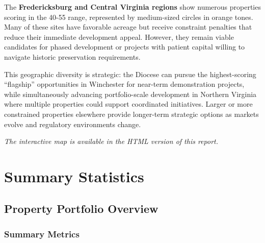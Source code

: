 \documentclass[
  letterpaper,
  DIV=11,
  numbers=noendperiod,
  oneside]{scrreprt}
\begin{document}
The \textbf{Fredericksburg and Central Virginia regions} show numerous
properties scoring in the 40-55 range, represented by medium-sized
circles in orange tones. Many of these sites have favorable acreage but
receive constraint penalties that reduce their immediate development
appeal. However, they remain viable candidates for phased development or
projects with patient capital willing to navigate historic preservation
requirements.

\begin{tcolorbox}[enhanced jigsaw, bottomtitle=1mm, left=2mm, rightrule=.15mm, colbacktitle=quarto-callout-tip-color!10!white, arc=.35mm, title=\textcolor{quarto-callout-tip-color}{\faLightbulb}\hspace{0.5em}{Tip}, bottomrule=.15mm, colback=white, colframe=quarto-callout-tip-color-frame, leftrule=.75mm, titlerule=0mm, opacitybacktitle=0.6, breakable, coltitle=black, toptitle=1mm, toprule=.15mm, opacityback=0]

This geographic diversity is strategic: the Diocese can pursue the
highest-scoring ``flagship'' opportunities in Winchester for near-term
demonstration projects, while simultaneously advancing portfolio-scale
development in Northern Virginia where multiple properties could support
coordinated initiatives. Larger or more constrained properties elsewhere
provide longer-term strategic options as markets evolve and regulatory
environments change.

\end{tcolorbox}

\emph{The interactive map is available in the HTML version of this
report.}

\part{Summary Statistics}

\chapter{Property Portfolio Overview}\label{property-portfolio-overview}

\section{Summary Metrics}\label{summary-metrics}
\end{document}
